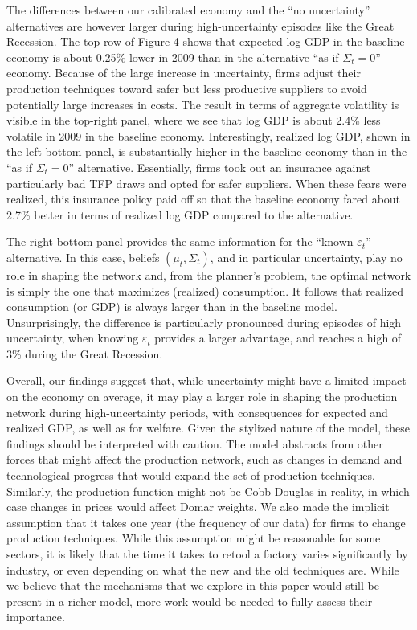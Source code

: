 \documentclass[11pt]{article}
\theoremstyle{definition}
\begin{document}
	The differences between our calibrated economy and the ``no uncertainty'' alternatives are however larger during high-uncertainty episodes like the Great Recession. The top row of Figure 4 shows that expected log GDP in the baseline economy is about 0.25\% lower in 2009 than in the alternative ``as if $\Sigma_t = 0$'' economy. Because of the large increase in uncertainty, firms adjust their production techniques toward safer but less productive suppliers to avoid potentially large increases in costs. The result in terms of aggregate volatility is visible in the top-right panel, where we see that log GDP is about 2.4\% less volatile in 2009 in the baseline economy. Interestingly, realized log GDP, shown in the left-bottom panel, is substantially higher in the baseline economy than in the ``as if $\Sigma_t = 0$'' alternative. Essentially, firms took out an insurance against particularly bad TFP draws and opted for safer suppliers. When these fears were realized, this insurance policy paid off so that the baseline economy fared about 2.7\% better in terms of realized log GDP compared to the alternative.
	
	The right-bottom panel provides the same information for the ``known $\varepsilon_t$'' alternative. In this case, beliefs $(\mu_t, \Sigma_t)$, and in particular uncertainty, play no role in shaping the network and, from the planner’s problem, the optimal network is simply the one that maximizes (realized) consumption. It follows that realized consumption (or GDP) is always larger than in the baseline model. Unsurprisingly, the difference is particularly pronounced during episodes of high uncertainty, when knowing $\varepsilon_t$ provides a larger advantage, and reaches a high of 3\% during the Great Recession.
	
	Overall, our findings suggest that, while uncertainty might have a limited impact on the economy on average, it may play a larger role in shaping the production network during high-uncertainty periods, with consequences for expected and realized GDP, as well as for welfare. Given the stylized nature of the model, these findings should be interpreted with caution. The model abstracts from other forces that might affect the production network, such as changes in demand and technological progress that would expand the set of production techniques. Similarly, the production function might not be Cobb-Douglas in reality, in which case changes in prices would affect Domar weights. We also made the implicit assumption that it takes one year (the frequency of our data) for firms to change production techniques. While this assumption might be reasonable for some sectors, it is likely that the time it takes to retool a factory varies significantly by industry, or even depending on what the new and the old techniques are. While we believe that the mechanisms that we explore in this paper would still be present in a richer model, more work would be needed to fully assess their importance.
	
\end{document}
